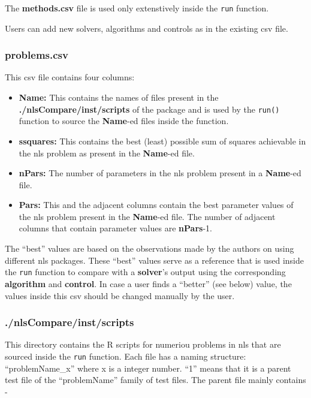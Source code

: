 The \textbf{methods.csv} file is used only extenstively inside the
\texttt{run} function.

Users can add new solvers, algorithms and controls as in the existing
csv file.

\hypertarget{problems.csv}{%
\subsubsection{problems.csv}\label{problems.csv}}

This csv file contains four columns:

\begin{itemize}
\tightlist
\item
  \textbf{Name:} This contains the names of files present in the
  \textbf{./nlsCompare/inst/scripts} of the package and is used by the
  \texttt{run()} function to source the \textbf{Name}-ed files inside
  the function.
\item
  \textbf{ssquares:} This contains the best (least) possible sum of
  squares achievable in the nls problem as present in the
  \textbf{Name}-ed file.
\item
  \textbf{nPars:} The number of parameters in the nls problem present in
  a \textbf{Name}-ed file.
\item
  \textbf{Pars:} This and the adjacent columns contain the best
  parameter values of the nls problem present in the \textbf{Name}-ed
  file. The number of adjacent columns that contain parameter values are
  \textbf{nPars}-1.
\end{itemize}

The ``best'' values are based on the observations made by the authors on
using different nls packages. These ``best'' values serve as a reference
that is used inside the \texttt{run} function to compare with a
\textbf{solver}'s output using the corresponding \textbf{algorithm} and
\textbf{control}. In case a user finds a ``better'' (see below) value,
the values inside this csv should be changed manually by the user.

\hypertarget{nlscompareinstscripts}{%
\subsubsection{./nlsCompare/inst/scripts}\label{nlscompareinstscripts}}

This directory contains the R scripts for numeriou problems in nls that
are sourced inside the \texttt{run} function. Each file has a naming
structure: ``problemName\_x'' where x is a integer number. ``1'' means
that it is a parent test file of the ``problemName'' family of test
files. The parent file mainly contains -

